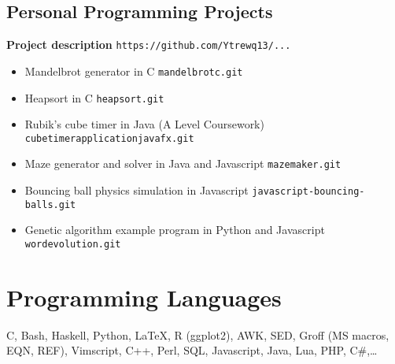 \documentclass[10pt]{extarticle}
\begin{document}
    \subsection{Personal Programming Projects}
        \hspace{1em} \textbf{Project description}
        \hfill
        \texttt{https://github.com/Ytrewq13/...}
        \begin{itemize}
            \item Mandelbrot generator in C
                \hfill
                \texttt{mandelbrotc.git}
            \item Heapsort in C
                \hfill
                \texttt{heapsort.git}
            \item Rubik's cube timer in Java
                \hfill
                (A Level Coursework)
                \hfill
                \texttt{cubetimerapplicationjavafx.git}
            \item Maze generator and solver in Java and Javascript
                \hfill
                \texttt{mazemaker.git}
            \item Bouncing ball physics simulation in Javascript
                \hfill
                \texttt{javascript-bouncing-balls.git}
            \item Genetic algorithm example program in Python and Javascript
                \hfill
                \texttt{wordevolution.git}
        \end{itemize}
\section{Programming Languages}
    C,
    Bash,
    Haskell,
    Python,
    \LaTeX,
    R (ggplot2),
    AWK,
    SED,
    Groff (MS macros, EQN, REF),
    Vimscript,
    C++,
    Perl,
    SQL,
    Javascript,
    Java,
    Lua,
    PHP,
    C\#,\ldots
\end{document}
